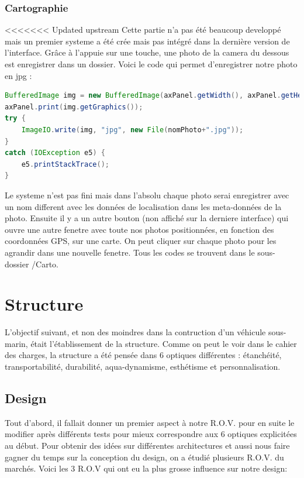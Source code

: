 \documentclass[a4paper,11pt]{report}
\begin{document}
		\subsection{Cartographie}
			\label{subsec:Cartographie}
<<<<<<< Updated upstream
			Cette partie n'a pas été beaucoup developpé mais un premier systeme a été crée mais pas intégré dans la dernière version de l'interface.
			\newline Grâce à l'appuie sur une touche, une photo de la camera du dessous est enregistrer dans un dossier. Voici le code qui permet d'enregistrer notre photo en jpg :
			\begin{lstlisting}[language=java]
BufferedImage img = new BufferedImage(axPanel.getWidth(), axPanel.getHeight(), BufferedImage.TYPE_INT_RGB);
axPanel.print(img.getGraphics());
try {
	ImageIO.write(img, "jpg", new File(nomPhoto+".jpg"));
}
catch (IOException e5) {
	e5.printStackTrace();
}
		\end{lstlisting}
			Le systeme n'est pas fini mais dans l'absolu chaque photo serai enregistrer avec un nom different avec les données de localisation dans les meta-données de la photo.
			\newline Ensuite il y a un autre bouton (non affiché sur la derniere interface) qui ouvre une autre fenetre avec toute nos photos positionnées, en fonction des coordonnées GPS, sur une carte.
			\newline On peut cliquer sur chaque photo pour les agrandir dans une nouvelle fenetre.
			\newline Tous les codes se trouvent dans le sous-dossier /Carto.
			\newpage	
			
\chapter{Structure}

	L'objectif suivant, et non des moindres dans la contruction d'un véhicule sous-marin, était l'établissement de la structure. Comme on peut le voir dans le cahier des charges, la structure a été pensée dans 6 optiques différentes : étanchéité, transportabilité, durabilité, aqua-dynamisme, esthétisme et personnalisation. 
				
				\section{Design}
				
				Tout d'abord, il fallait donner un premier aspect à notre R.O.V. pour en suite le modifier après différents tests pour mieux correspondre aux 6 optiques explicitées au début. Pour obtenir des idées sur différentes architectures et aussi nous faire gagner du temps sur la conception du design, on a étudié plusieurs R.O.V. du marchés. Voici les 3 R.O.V qui ont eu la plus grosse influence sur notre design:
					
\end{document}
